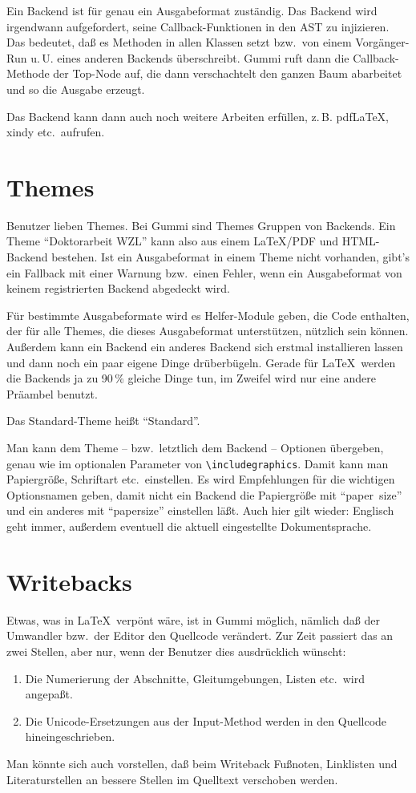 \documentclass[12pt,openany]{book}
\begin{document}
Ein Backend ist für genau ein Ausgabeformat zuständig.  Das Backend wird
irgendwann aufgefordert, seine Callback-Funktionen in den AST zu injizieren.
Das bedeutet, daß es Methoden in allen Klassen setzt bzw.\ von einem
Vorgänger-Run u.\,U. eines anderen Backends überschreibt.  Gummi ruft dann die
Callback-Methode der Top-Node auf, die dann verschachtelt den ganzen Baum
abarbeitet und so die Ausgabe erzeugt.

Das Backend kann dann auch noch weitere Arbeiten erfüllen, z.\,B. pdfLaTeX,
xindy etc.\ aufrufen.


\section{Themes}

Benutzer lieben Themes.  Bei Gummi sind Themes Gruppen von Backends.  Ein Theme
"`Doktorarbeit WZL"' kann also aus einem \LaTeX/PDF und HTML-Backend bestehen.
Ist ein Ausgabeformat in einem Theme nicht vorhanden, gibt's ein Fallback mit
einer Warnung bzw.\ einen Fehler, wenn ein Ausgabeformat von keinem
registrierten Backend abgedeckt wird.

Für bestimmte Ausgabeformate wird es Helfer-Module geben, die Code enthalten,
der für alle Themes, die dieses Ausgabeformat unterstützen, nützlich sein
können.  Außerdem kann ein Backend ein anderes Backend sich erstmal
installieren lassen und dann noch ein paar eigene Dinge drüberbügeln.  Gerade
für \LaTeX\ werden die Backends ja zu 90\,\% gleiche Dinge tun, im Zweifel wird
nur eine andere Präambel benutzt.

Das Standard-Theme heißt "`Standard"'.

Man kann dem Theme -- bzw.\ letztlich dem Backend -- Optionen übergeben, genau
wie im optionalen Parameter von \verb|\includegraphics|.  Damit kann man
Papiergröße, Schriftart etc.\ einstellen.  Es wird Empfehlungen für die
wichtigen Optionsnamen geben, damit nicht ein Backend die Papiergröße mit
"`paper~size"' und ein anderes mit "`papersize"' einstellen läßt.  Auch hier
gilt wieder: Englisch geht immer, außerdem eventuell die aktuell eingestellte
Dokumentsprache.

\section{Writebacks}

Etwas, was in \LaTeX\ verpönt wäre, ist in Gummi möglich, nämlich daß der
Umwandler bzw.\ der Editor den Quellcode verändert.  Zur Zeit passiert das an
zwei Stellen, aber nur, wenn der Benutzer dies ausdrücklich wünscht:

\begin{enumerate}
\item Die Numerierung der Abschnitte, Gleitumgebungen, Listen etc.\ wird
  angepaßt.
\item Die Unicode-Ersetzungen aus der Input-Method werden in den Quellcode
  hineingeschrieben.
\end{enumerate}

Man könnte sich auch vorstellen, daß beim Writeback Fußnoten, Linklisten und
Literaturstellen an bessere Stellen im Quelltext verschoben werden.
\end{document}
